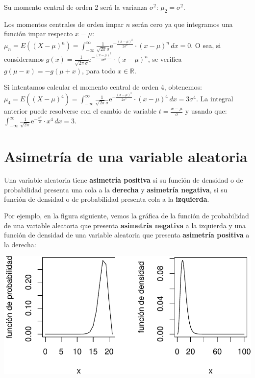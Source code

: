 \documentclass[
  letterpaper,
  DIV=11,
  numbers=noendperiod]{scrreprt}
\begin{document}
Su momento central de orden 2 será la varianza \(\sigma^2\):
\(\mu_2 =\sigma^2.\)

Los momentos centrales de orden impar \(n\) serán cero ya que integramos
una función impar respecto \(x=\mu\):
\(\mu_n = E\left((X-\mu)^n\right)=\int_{-\infty}^\infty \frac{1}{\sqrt{2\pi}\sigma}\mathrm{e}^{-\frac{(x-\mu)^2}{2\sigma^2}}\cdot (x-\mu)^n\, dx = 0.\)
O sea, si consideramos
\(g(x)=\frac{1}{\sqrt{2\pi}\sigma}\mathrm{e}^{-\frac{(x-\mu)^2}{2\sigma^2}}\cdot (x-\mu)^n\),
se verifica \(g(\mu-x)=-g(\mu +x)\), para todo \(x\in\mathbb{R}\).

Si intentamos calcular el momento central de orden 4, obtenemos:
\(\mu_4 = E\left((X-\mu)^4\right)=\int_{-\infty}^\infty \frac{1}{\sqrt{2\pi}\sigma}\mathrm{e}^{-\frac{(x-\mu)^2}{2\sigma^2}}\cdot (x-\mu)^4\, dx = 3\sigma^4.\)
La integral anterior puede resolverse con el cambio de variable
\(t=\frac{x-\mu}{\sigma}\) y usando que:
\(\int_{-\infty}^\infty \frac{1}{\sqrt{2\pi}}\mathrm{e}^{-\frac{x^2}{2}}\cdot x^4\, dx = 3.\)

\hypertarget{asimetruxeda-de-una-variable-aleatoria}{%
\section{Asimetría de una variable
aleatoria}\label{asimetruxeda-de-una-variable-aleatoria}}

Una variable aleatoria tiene \textbf{asimetría positiva} si su función
de densidad o de probabilidad presenta una cola a la \textbf{derecha} y
\textbf{asimetría negativa}, si su función de densidad o de probabilidad
presenta cola a la \textbf{izquierda}.

Por ejemplo, en la figura siguiente, vemos la gráfica de la función de
probabilidad de una variable aleatoria que presenta \textbf{asimetría
negativa} a la izquierda y una función de densidad de una variable
aleatoria que presenta \textbf{asimetría positiva} a la derecha:

\includegraphics{4_files/figure-pdf/unnamed-chunk-1-1.pdf}
\end{document}
